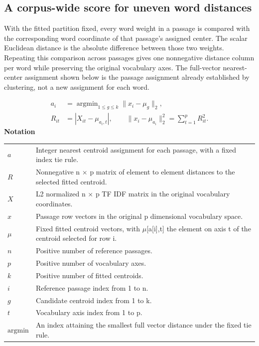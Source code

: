 \documentclass[10pt,letterpaper]{article}
\newcommand{\notlabel}{\noindent\textbf{Notation}\par\nobreak\vspace{4pt}}
\begin{document}
\subsection{A corpus-wide score for uneven word distances}
With the fitted partition fixed, every word weight in a passage is compared with the corresponding word coordinate of that passage's assigned center. The scalar Euclidean distance is the absolute difference between those two weights. Repeating this comparison across passages gives one nonnegative distance column per word while preserving the original vocabulary axes. The full-vector nearest-center assignment shown below is the passage assignment already established by clustering, not a new assignment for each word.\par

\par\noindent\begin{minipage}{\linewidth}
\begin{equation}\label{eq:coordinatedistances}
\begin{aligned}a_i&=\mathop{\arg\min}_{1\le g\le k}\lVert x_i-\mu_g\rVert_2,\\R_{it}&=|X_{it}-\mu_{a_i,t}|,\qquad\lVert x_i-\mu_{a_i}\rVert_2^2=\sum_{t=1}^{p}R_{it}^2.\end{aligned}
\end{equation}
\notlabel
{\fontsize{8.5}{10.5}\selectfont\setlength{\tabcolsep}{0pt}\renewcommand{\arraystretch}{1.12}
\begin{tabularx}{\linewidth}{@{}p{.14\linewidth}X@{}}
$a$ & Integer nearest centroid assignment for each passage, with a fixed index tie rule.\\
$R$ & Nonnegative n \ensuremath{\times} p matrix of element to element distances to the selected fitted centroid.\\
$X$ & L2 normalized n \ensuremath{\times} p TF IDF matrix in the original vocabulary coordinates.\\
$x$ & Passage row vectors in the original p dimensional vocabulary space.\\
$\mu$ & Fixed fitted centroid vectors, with \ensuremath{\mu}[a[i],t] the element on axis t of the centroid selected for row i.\\
$n$ & Positive number of reference passages.\\
$p$ & Positive number of vocabulary axes.\\
$k$ & Positive number of fitted centroids.\\
$i$ & Reference passage index from 1 to n.\\
$g$ & Candidate centroid index from 1 to k.\\
$t$ & Vocabulary axis index from 1 to p.\\
$\mathrm{argmin}$ & An index attaining the smallest full vector distance under the fixed tie rule.\\
\end{tabularx}}
\par\vspace{2pt}
\end{minipage}\par
\end{document}
